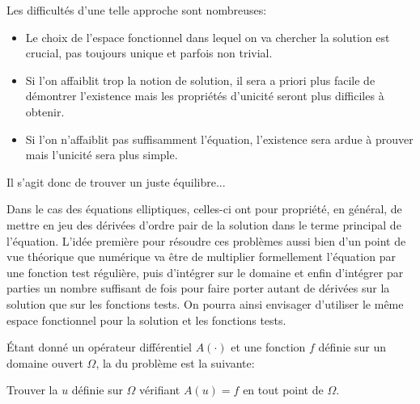 \medskip



Les difficultés d'une telle approche sont nombreuses:
\begin{itemize}
   \item Le choix de l'espace fonctionnel dans lequel on va chercher la solution est crucial,
	pas toujours unique et parfois non trivial.
   \item Si l'on affaiblit trop la notion de solution, il sera a priori plus facile de démontrer l'existence
	mais les propriétés d'unicité seront plus difficiles à obtenir.
   \item Si l'on n'affaiblit pas suffisamment l'équation, l'existence sera ardue à prouver mais
	l'unicité sera plus simple.
\end{itemize}


\medskip



Il s'agit donc de trouver un juste équilibre...

Dans le cas des équations elliptiques, celles-ci ont pour propriété, en général, de mettre en jeu
des dérivées d'ordre pair de la solution dans le terme principal de l'équation.
L'idée première pour résoudre ces problèmes aussi bien d'un point de vue théorique
que numérique va être de multiplier formellement l'équation par une fonction test régulière,
puis d'intégrer sur le domaine et enfin d'intégrer par parties un nombre suffisant de fois pour
faire porter autant de dérivées sur la solution que sur les fonctions tests.
On pourra ainsi envisager d'utiliser le même espace fonctionnel pour la solution et les
fonctions tests.






\bigskip


%
%
Étant donné un opérateur différentiel $A(\cdot)$ et une fonction $f$ définie sur un domaine
ouvert $\Omega$, la  du problème est la suivante:
\begin{center}
    Trouver la  $u$ définie sur $\Omega$ vérifiant $A(u)=f$ en tout point de $\Omega$.
\end{center}

